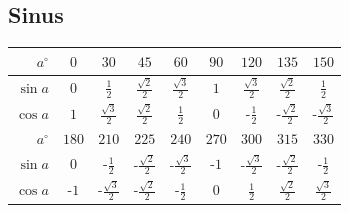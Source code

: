 \documentclass[8pt,a4paper,landscape]{scrartcl}
\begin{document}
\begin{multicols*}{3}
\subsection*{Sinus}
\begin{tabularx}{\columnwidth}{r|c|c|c|c|c|c|c|c|}
	$ a^\circ $ & $ 0 $ & $ 30 $ & $ 45 $ & $ 60 $ & $ 90 $ & $ 120 $ & $ 135 $ & $ 150 $ \\ \hline
	$ \sin a$& $ 0 $& $ \frac{1}{2} $& $ \frac{\sqrt{2}}{2} $& $ \frac{\sqrt{3}}{2} $& $ 1 $& $ \frac{\sqrt{3}}{2} $& $ \frac{\sqrt{2}}{2} $& $ \frac{1}{2} $\\ \hline
	$ \cos a$& $ 1 $& $ \frac{\sqrt{3}}{2} $& $ \frac{\sqrt{2}}{2} $& $ \frac{1}{2} $& $ 0 $& $ \text{-}\frac{1}{2} $& $ \text{-}\frac{\sqrt{2}}{2} $& $ \text{-}\frac{\sqrt{3}}{2} $ \\ \hline \hline
$ a^\circ $ & $ 180 $ & $ 210 $ & $ 225 $ & $ 240 $ & $ 270 $ & $ 300 $ & $ 315 $ & $ 330 $ \\ \hline
$ \sin a$& $ 0 $& $ \text{-}\frac{1}{2} $& $ \text{-}\frac{\sqrt{2}}{2} $& $ \text{-}\frac{\sqrt{3}}{2} $& $ \text{-}1 $& $ \text{-}\frac{\sqrt{3}}{2} $& $ \text{-}\frac{\sqrt{2}}{2} $& $ \text{-}\frac{1}{2} $\\ \hline
$ \cos a$& $ \text{-}1 $& $ \text{-}\frac{\sqrt{3}}{2} $& $ \text{-}\frac{\sqrt{2}}{2} $& $ \text{-}\frac{1}{2} $& $ 0 $& $ \frac{1}{2} $& $ \frac{\sqrt{2}}{2} $& $ \frac{\sqrt{3}}{2} $
\end{tabularx}
\end{multicols*}
\end{document}
